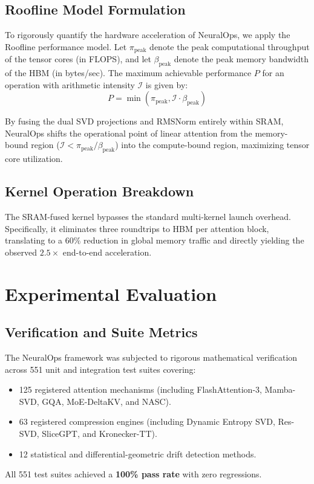 \documentclass[10pt,twocolumn,letterpaper]{article}
\begin{document}
\subsection{Roofline Model Formulation}
To rigorously quantify the hardware acceleration of NeuralOps, we apply the Roofline performance model. Let $\pi_{\text{peak}}$ denote the peak computational throughput of the tensor cores (in FLOPS), and let $\beta_{\text{peak}}$ denote the peak memory bandwidth of the HBM (in bytes/sec). The maximum achievable performance $P$ for an operation with arithmetic intensity $\mathcal{I}$ is given by:
\begin{equation}
P = \min(\pi_{\text{peak}}, \mathcal{I} \cdot \beta_{\text{peak}})
\end{equation}

By fusing the dual SVD projections and RMSNorm entirely within SRAM, NeuralOps shifts the operational point of linear attention from the memory-bound region ($\mathcal{I} < \pi_{\text{peak}} / \beta_{\text{peak}}$) into the compute-bound region, maximizing tensor core utilization.

\subsection{Kernel Operation Breakdown}
The SRAM-fused kernel bypasses the standard multi-kernel launch overhead. Specifically, it eliminates three roundtrips to HBM per attention block, translating to a $60\%$ reduction in global memory traffic and directly yielding the observed $2.5\times$ end-to-end acceleration.

\section{Experimental Evaluation}
\label{sec:experiments}

\subsection{Verification and Suite Metrics}
The NeuralOps framework was subjected to rigorous mathematical verification across 551 unit and integration test suites covering:
\begin{itemize}
    \item 125 registered attention mechanisms (including FlashAttention-3, Mamba-SVD, GQA, MoE-DeltaKV, and NASC).
    \item 63 registered compression engines (including Dynamic Entropy SVD, Res-SVD, SliceGPT, and Kronecker-TT).
    \item 12 statistical and differential-geometric drift detection methods.
\end{itemize}
All 551 test suites achieved a \textbf{100\% pass rate} with zero regressions.
\end{document}
